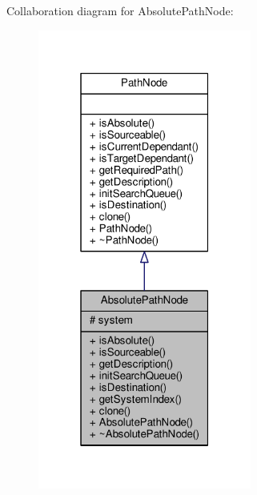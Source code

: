 Collaboration diagram for Absolute\+Path\+Node\+:
\nopagebreak
\begin{figure}[H]
\begin{center}
\leavevmode
\includegraphics[width=199pt]{db/d48/classAbsolutePathNode__coll__graph}
\end{center}
\end{figure}
